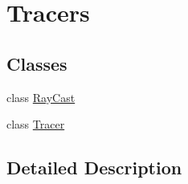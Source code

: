 \hypertarget{group___tracers}{}\section{Tracers}
\label{group___tracers}
\subsection*{Classes}
\begin{DoxyCompactItemize}
\item 
class \hyperlink{class_ray_cast}{Ray\+Cast}
\item 
class \hyperlink{class_tracer}{Tracer}
\end{DoxyCompactItemize}


\subsection{Detailed Description}
